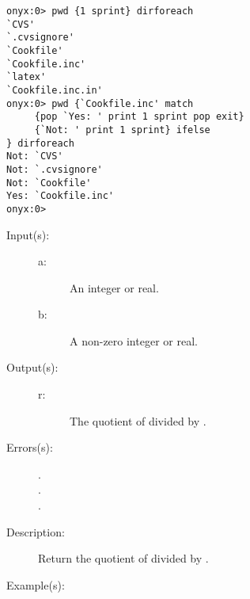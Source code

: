 \begin{description}
\begin{description}
\begin{verbatim}
onyx:0> pwd {1 sprint} dirforeach
`CVS'
`.cvsignore'
`Cookfile'
`Cookfile.inc'
`latex'
`Cookfile.inc.in'
onyx:0> pwd {`Cookfile.inc' match
     {pop `Yes: ' print 1 sprint pop exit}
     {`Not: ' print 1 sprint} ifelse
} dirforeach
Not: `CVS'
Not: `.cvsignore'
Not: `Cookfile'
Yes: `Cookfile.inc'
onyx:0>
		\end{verbatim}
	\end{description}
\label{systemdict:div}
\item[{\onyxop{a b}{div}{r}}: ]
	\begin{description}\item[]
	\item[Input(s): ]
		\begin{description}\item[]
		\item[a: ]
			An integer or real.
		\item[b: ]
			A non-zero integer or real.
		\end{description}
	\item[Output(s): ]
		\begin{description}\item[]
		\item[r: ]
			The quotient of  divided by .
		\end{description}
	\item[Errors(s): ]
		\begin{description}\item[]
		\item[.]
		\item[.]
		\item[.]
		\end{description}
	\item[Description: ]
		Return the quotient of  divided by .
	\item[Example(s): ]\begin{verbatim}


\end{verbatim}
\end{description}
\end{description}
